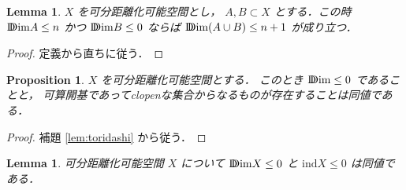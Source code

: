 \documentclass[leqno, a4paper, 12pt]{jsarticle}
\theoremstyle{plain}
\newtheorem{prop}[thm]{Proposition}
\newtheorem{lem}[thm]{Lemma}
\theoremstyle{definition}
\theoremstyle{remark}
\newcommand{\yoind}{\mathrm{ind}}
\newcommand{\yoddim}{\mathrm{D\hspace{-5.5pt}Dim}}
\numberwithin{equation}{section}
\begin{document}
\begin{lem}\label{lem:plpl}
$X$
を可分距離化可能空間とし，
$A, B\subset X$
とする．この時
$\yoddim A\le n$
かつ
$\yoddim B\le 0$
ならば
$\yoddim (A\cup B)\le n+1$
が成り立つ．
\end{lem}
\begin{proof}
定義から直ちに従う．
\end{proof}





\begin{prop}
$X$
を可分距離化可能空間とする．
このとき
$\yoddim\le 0$
であることと，
可算開基であってclopenな集合からなるものが存在することは同値である．
\end{prop}
\begin{proof}
補題
\ref{lem:toridashi}
から従う．
\end{proof}

\begin{lem}\label{lem:sum:0inda0ddim}
可分距離化可能空間
$X$
について
$\yoddim X\le 0$
と
$\yoind X\le 0$
は同値である．
\end{lem}
\end{document}
